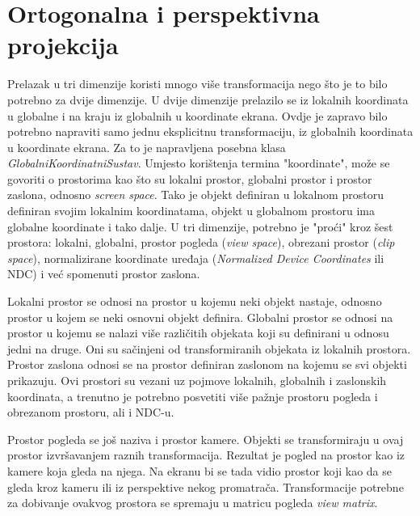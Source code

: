 \documentclass{foi}
\begin{document}
\section{Ortogonalna i perspektivna projekcija}
Prelazak u tri dimenzije koristi mnogo više transformacija nego što je to bilo potrebno za dvije dimenzije. U dvije dimenzije prelazilo se iz lokalnih koordinata u globalne i na kraju iz globalnih u koordinate ekrana. Ovdje je zapravo bilo potrebno napraviti samo jednu eksplicitnu transformaciju, iz globalnih koordinata u koordinate ekrana. Za to je napravljena posebna klasa \textit{GlobalniKoordinatniSustav}. Umjesto korištenja termina "koordinate", može se govoriti o prostorima kao što su lokalni prostor, globalni prostor i prostor zaslona, odnosno \textit{screen space}. Tako je objekt definiran u lokalnom prostoru definiran svojim lokalnim koordinatama, objekt u globalnom prostoru ima globalne koordinate i tako dalje. U tri dimenzije, potrebno je "proći" kroz šest prostora: lokalni, globalni, prostor pogleda (\textit{view space}), obrezani prostor (\textit{clip space}), normalizirane koordinate uređaja (\textit{Normalized Device Coordinates} ili NDC) i već spomenuti prostor zaslona.

Lokalni prostor se odnosi na prostor u kojemu neki objekt nastaje, odnosno prostor u kojem se neki osnovni objekt definira. Globalni prostor se odnosi na prostor u kojemu se nalazi više različitih objekata koji su definirani u odnosu jedni na druge. Oni su sačinjeni od transformiranih objekata iz lokalnih prostora. Prostor zaslona odnosi se na prostor definiran zaslonom na kojemu se svi objekti prikazuju. Ovi prostori su vezani uz pojmove lokalnih, globalnih i zaslonskih koordinata, a trenutno je potrebno posvetiti više pažnje prostoru pogleda i obrezanom prostoru, ali i NDC-u.  

Prostor pogleda se još naziva i prostor kamere. Objekti se transformiraju u ovaj prostor izvršavanjem raznih transformacija. Rezultat je pogled na prostor kao iz kamere koja gleda na njega. Na ekranu bi se tada vidio prostor koji kao da se gleda kroz kameru ili iz perspektive nekog promatrača. Transformacije potrebne za dobivanje ovakvog prostora se spremaju u matricu pogleda \textit{view matrix}. 
\end{document}
